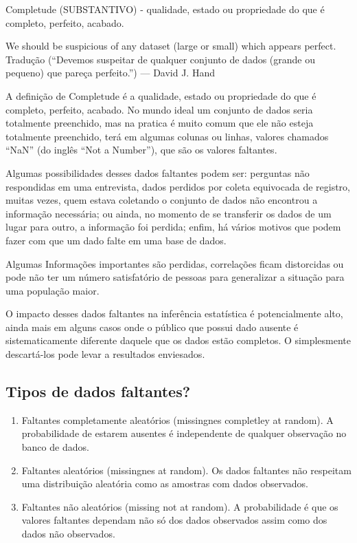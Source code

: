 \documentclass[
]{article}
\providecommand{\tightlist}{%
  \setlength{\itemsep}{0pt}\setlength{\parskip}{0pt}}
\begin{document}
Completude (SUBSTANTIVO) - qualidade, estado ou propriedade do que é
completo, perfeito, acabado.

We should be suspicious of any dataset (large or small) which appears
perfect. Tradução (``Devemos suspeitar de qualquer conjunto de dados
(grande ou pequeno) que pareça perfeito.'') --- David J. Hand

A definição de Completude é a qualidade, estado ou propriedade do que é
completo, perfeito, acabado. No mundo ideal um conjunto de dados seria
totalmente preenchido, mas na pratica é muito comum que ele não esteja
totalmente preenchido, terá em algumas colunas ou linhas, valores
chamados ``NaN'' (do inglês ``Not a Number''), que são os valores
faltantes.

Algumas possibilidades desses dados faltantes podem ser: perguntas não
respondidas em uma entrevista, dados perdidos por coleta equivocada de
registro, muitas vezes, quem estava coletando o conjunto de dados não
encontrou a informação necessária; ou ainda, no momento de se transferir
os dados de um lugar para outro, a informação foi perdida; enfim, há
vários motivos que podem fazer com que um dado falte em uma base de
dados.

Algumas Informações importantes são perdidas, correlações ficam
distorcidas ou pode não ter um número satisfatório de pessoas para
generalizar a situação para uma população maior.

O impacto desses dados faltantes na inferência estatística é
potencialmente alto, ainda mais em alguns casos onde o público que
possui dado ausente é sistematicamente diferente daquele que os dados
estão completos. O simplesmente descartá-los pode levar a resultados
enviesados.

\hypertarget{tipos-de-dados-faltantes}{%
\subsection{Tipos de dados faltantes?}\label{tipos-de-dados-faltantes}}

\begin{enumerate}
\def\labelenumi{\arabic{enumi}.}
\tightlist
\item
  Faltantes completamente aleatórios (missingnes completley at random).
  A probabilidade de estarem ausentes é independente de qualquer
  observação no banco de dados.
\item
  Faltantes aleatórios (missingnes at random). Os dados faltantes não
  respeitam uma distribuição aleatória como as amostras com dados
  observados.
\item
  Faltantes não aleatórios (missing not at random). A probabilidade é
  que os valores faltantes dependam não só dos dados observados assim
  como dos dados não observados.
\end{enumerate}
\end{document}

